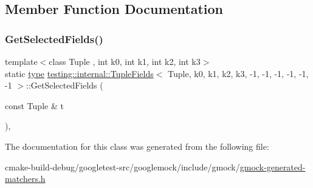 \subsection{Member Function Documentation}
\mbox{\label{classtesting_1_1internal_1_1TupleFields_3_01Tuple_00_01k0_00_01k1_00_01k2_00_01k3_00_01-1_00_01-5ce285d726b58f03354f318c4712939e_ab425de0d7d5a7f13894b5e52ad8b553a}} 
\subsubsection{\texorpdfstring{GetSelectedFields()}{GetSelectedFields()}}
{\footnotesize\ttfamily template$<$class Tuple , int k0, int k1, int k2, int k3$>$ \\
static \mbox{\hyperlink{classtesting_1_1internal_1_1TupleFields_3_01Tuple_00_01k0_00_01k1_00_01k2_00_01k3_00_01-1_00_01-5ce285d726b58f03354f318c4712939e_a543de8075300fc9ee1b9f3494d492fb5}{type}} \mbox{\hyperlink{classtesting_1_1internal_1_1TupleFields}{testing\+::internal\+::\+Tuple\+Fields}}$<$ Tuple, k0, k1, k2, k3, -\/1, -\/1, -\/1, -\/1, -\/1, -\/1 $>$\+::Get\+Selected\+Fields (\begin{DoxyParamCaption}\item[{const Tuple \&}]{t }\end{DoxyParamCaption})\hspace{0.3cm}{\ttfamily [inline]}, {\ttfamily [static]}}



The documentation for this class was generated from the following file\+:\begin{DoxyCompactItemize}
\item 
cmake-\/build-\/debug/googletest-\/src/googlemock/include/gmock/\mbox{\hyperlink{gmock-generated-matchers_8h}{gmock-\/generated-\/matchers.\+h}}\end{DoxyCompactItemize}
